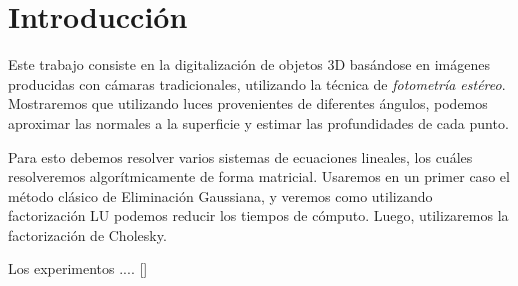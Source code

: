 \section{Introducción}


Este trabajo consiste en la digitalización de objetos 3D basándose en imágenes producidas con cámaras tradicionales, utilizando la técnica de \textit{fotometría estéreo}. Mostraremos que utilizando luces provenientes de diferentes ángulos, podemos aproximar las normales a la superficie y estimar las profundidades de cada punto.

Para esto debemos resolver varios sistemas de ecuaciones lineales, los cuáles resolveremos algorítmicamente de forma matricial. Usaremos en un primer caso el método clásico de Eliminación Gaussiana, y veremos como utilizando factorización LU podemos reducir los tiempos de cómputo. Luego, utilizaremos la factorización de Cholesky.

Los experimentos .... []
